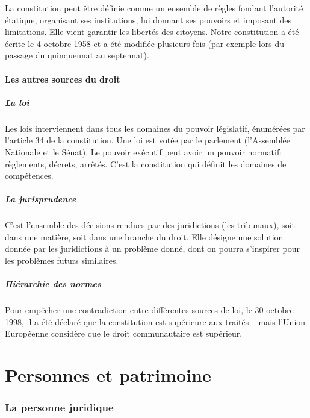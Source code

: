 \documentclass[10pt,a4paper]{article}
\begin{document}
La constitution peut être définie comme un ensemble de règles fondant l'autorité étatique, organisant ses institutions, lui donnant ses pouvoirs et imposant des limitations. Elle vient garantir les libertés des citoyens. Notre constitution a été écrite le 4 octobre 1958 et a été modifiée plusieurs fois (par exemple lors du passage du quinquennat au septennat).

\subsection{Les autres sources du droit}

\subsubsection{La loi}

Les lois interviennent dans tous les domaines du pouvoir législatif, énumérées par l'article 34 de la constitution. Une loi est votée par le parlement (l'Assemblée Nationale et le Sénat). Le pouvoir exécutif peut avoir un pouvoir normatif: règlements, décrets, arrêtés. C'est la constitution qui définit les domaines de compétences.

\subsubsection{La jurisprudence}

C'est l'ensemble des décisions rendues par des juridictions (les tribunaux), soit dans une matière, soit dans une branche du droit. Elle désigne une solution donnée par les juridictions à un problème donné, dont on pourra s'inspirer pour les problèmes futurs similaires.

\subsubsection{Hiérarchie des normes}

Pour empêcher une contradiction entre différentes sources de loi, le 30 octobre 1998, il a été déclaré que la constitution est supérieure aux traités -- mais l'Union Européenne considère que le droit communautaire est supérieur.

\part{Personnes et patrimoine}

\section{La personne juridique}
\end{document}
